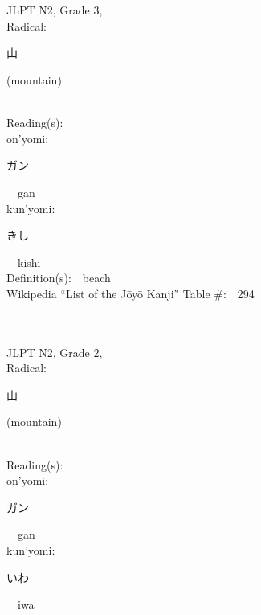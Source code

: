 \begin{multicols}{2}
\ \ \\
{\fontsize{34pt}{40pt}  }\ \ \\  %
{JLPT N2, Grade 3, \\Radical:\ \ {\begin{CJK}{UTF8}{min} 山 \end{CJK}} (mountain) } \\
Reading(s):\ \ \\
{\hspace*{1em}}on'yomi:\ \ \\
{\hspace*{2em}}{\begin{CJK}{UTF8}{min} ガン \end{CJK}}\ \ gan\ \ \\
{\hspace*{1em}}kun'yomi:\ \ \\
{\hspace*{2em}}{\begin{CJK}{UTF8}{min} きし \end{CJK}}\ \ kishi\ \ \\
Definition(s):\ \ beach \\
Wikipedia ``List of the J\=oy\=o Kanji'' Table \#:\ \ 294 \\
\ \ \\
{\fontsize{34pt}{40pt}  }\ \ \\  %
{JLPT N2, Grade 2, \\Radical:\ \ {\begin{CJK}{UTF8}{min} 山 \end{CJK}} (mountain) } \\
Reading(s):\ \ \\
{\hspace*{1em}}on'yomi:\ \ \\
{\hspace*{2em}}{\begin{CJK}{UTF8}{min} ガン \end{CJK}}\ \ gan\ \ \\
{\hspace*{1em}}kun'yomi:\ \ \\
{\hspace*{2em}}{\begin{CJK}{UTF8}{min} いわ \end{CJK}}\ \ iwa\ \ \\

\end{multicols}
